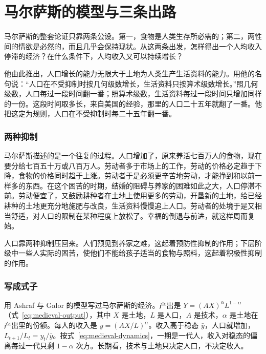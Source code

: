 \section{马尔萨斯的模型与三条出路}\label{sec:divergence-malthus}

马尔萨斯的整套论证只靠两条公设。第一，食物是人类生存所必需的；第二，两性间的情欲是必然的，而且几乎会保持现状\cite{malthus1798}。从这两条出发，怎样得出一个人均收入停滞的经济？在什么条件下，人均收入又可以持续增长？

他由此推出，人口增长的能力无限大于土地为人类生产生活资料的能力。用他的名句说：“人口在不受抑制时按几何级数增长，生活资料只按算术级数增长。”\cite{malthus1798}照几何级数，人口每过一段时间翻一番；照算术级数，生活资料每过一段时间只增加同样的一份。这段时间取多长，来自美国的经验，那里的人口二十五年就翻了一番。他把这定为规则，人口在不受抑制时每二十五年翻一番\cite{malthus1798}。

\subsubsection{两种抑制}
马尔萨斯描述的是一个往复的过程。人口增加了，原来养活七百万人的食物，现在要分给七百五十万或八百万人。劳动者多于市场上的工作，劳动的价格必定趋于下降，食物的价格同时趋于上涨。劳动者于是必须更辛苦地劳动，才能挣到和以前一样多的东西\cite{malthus1798}。在这个困苦的时期，结婚的阻碍与养家的困难如此之大，人口停滞不前。劳动便宜了，又鼓励耕种者在土地上使用更多的劳动，开垦新的土地，给已经耕种的土地更充分地施肥与改良，生活资料慢慢追上人口。劳动者的处境于是又相当舒适，对人口的限制在某种程度上放松了。幸福的倒退与前进，就这样周而复始\cite{malthus1798}。

人口靠两种抑制压回来。人们预见到养家之难，这起着预防性抑制的作用；下层阶级中一些人实际的困苦，使他们不能给孩子适当的食物与照料，这起着积极性抑制的作用\cite{malthus1798}。

\subsubsection{写成式子}
用 Ashraf 与 Galor 的模型写过马尔萨斯的经济\cite{ashrafgalor2011}。产出是 $Y=(AX)^{\alpha}L^{1-\alpha}$（式~\eqref{eq:medieval-output}），其中 $X$ 是土地，$L$ 是人口，$A$ 是技术，$\alpha$ 是土地在产出里的份额。每人的收入是 $y=(AX/L)^{\alpha}$。收入高于稳态 $\bar y$，人口就增加，$L_{t+1}/L_t=y_t/\bar y$。按式~\eqref{eq:medieval-dynamics}，一期是一代人，收入对稳态的偏离每过一代只剩 $1-\alpha$ 次方。长期看，技术与土地只决定人口，不决定收入。

